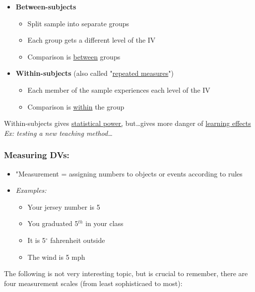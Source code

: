 \documentclass[11pt]{report}
\begin{document}
{
\begin{itemize}
    \item \textbf{Between-subjects}
    \begin{itemize}
        \item Split sample into separate groups 
        \item Each group gets a different level of the IV 
        \item Comparison is \underline{between} groups
    \end{itemize}
    \item \textbf{Within-subjects} (also called "\underline{repeated measures}")
    \begin{itemize}
        \item Each member of the sample experiences each level of the IV 
        \item Comparison is \underline{within} the group
    \end{itemize}
\end{itemize}
Within-subjects gives \underline{statistical power,} but\dots gives more danger of \underline{learning effects} \newline 
\textit{Ex: testing a new teaching method\dots}
}
\subsubsection{Measuring DVs:}
\begin{itemize}
    \item "Measurement = assigning numbers to objects or events according to rules 
    \item \textit{Examples:}
    \begin{itemize}
        \item Your jersey number is 5 
        \item You graduated 5$^{th}$ in your class
        \item It is 5$^{\circ}$ fahrenheit outside
        \item The wind is 5 mph
    \end{itemize}
\end{itemize}
The following is not very interesting topic, but is crucial to remember, there are four measurement scales (from least sophisticaed to most):
\end{document}
